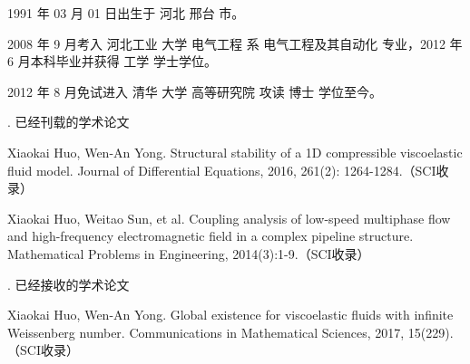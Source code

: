 \begin{resume}


  1991 年 03 月 01 日出生于 河北 邢台 市。

  2008 年 9 月考入 河北工业 大学  电气工程 系 电气工程及其自动化 专业，2012 年 6 月本科毕业并获得 工学 学士学位。

  2012 年 8 月免试进入 清华 大学 高等研究院 攻读 博士 学位至今。

. 已经刊载的学术论文%

  \begin{publications}
  \item Xiaokai Huo, Wen-An Yong. Structural stability of a 1D compressible viscoelastic fluid model. Journal of Differential Equations, 2016, 261(2): 1264-1284.（SCI收录）
  \item Xiaokai Huo, Weitao Sun, et al. Coupling analysis of low-speed multiphase flow and high-frequency electromagnetic field in a complex pipeline structure. Mathematical Problems in Engineering, 2014(3):1-9.（SCI收录）
  \end{publications}

  . 已经接收的学术论文%

  \begin{publications}
  \item Xiaokai Huo, Wen-An Yong. Global existence for viscoelastic fluids with infinite Weissenberg number. Communications in Mathematical Sciences, 2017, 15(229).（SCI收录）
  \end{publications}

\end{resume}
